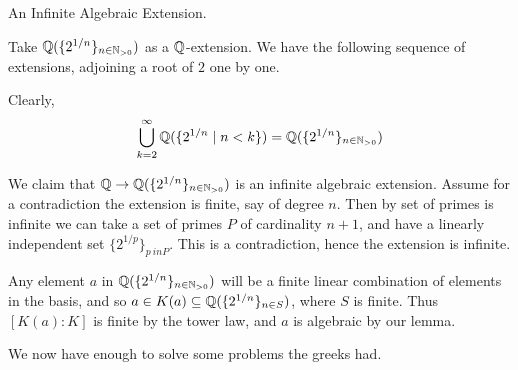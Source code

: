 \documentclass[../book.tex]{subfiles}
\begin{document}
\begin{ex} An Infinite Algebraic Extension.

    Take $\mathbb{Q}(\{2^{1/n}\}_{n \in \mathbb{N}_{>0}})$ as a $\mathbb{Q}$-extension. 
    We have the following sequence of extensions, 
    adjoining a root of $2$ one by one. 
    \begin{figure}[H]
        \centering
    \end{figure}
    Clearly, \[
        \bigcup_{k = 2}^\infty \mathbb{Q}(\{2^{1/n} \mid n < k\}) = 
        \mathbb{Q}(\{2^{1/n}\}_{n \in \mathbb{N}_{>0}})
    \]
    
    We claim that $\mathbb{Q} \to \mathbb{Q}(\{2^{1/n}\}_{n \in \mathbb{N}_{>0}})$ 
    is an infinite algebraic extension. 
    Assume for a contradiction the extension is finite, 
    say of degree $n$. 
    Then by set of primes is infinite we can take a set of primes 
    $P$ of cardinality $n+1$, 
    and have a linearly independent set $\{2^{1/p}\}_{p\ in P}$.
    This is a contradiction, hence the extension is infinite.
    
    Any element $a$ in $\mathbb{Q}(\{2^{1/n}\}_{n \in \mathbb{N}_{>0}})$ 
    will be a finite linear combination of elements in the basis, 
    and so $a \in K(a) \subseteq \mathbb{Q}(\{2^{1/n}\}_{n \in S})$, where $S$ is finite. 
    Thus $[K(a):K]$ is finite by the tower law, and $a$ is algebraic by our lemma.
    
\end{ex}

We now have enough to solve some problems the greeks had.

\end{document}
